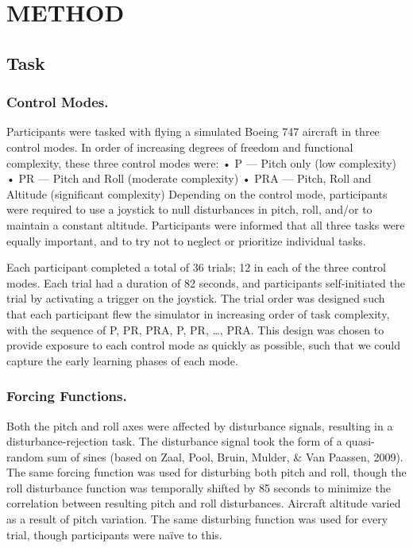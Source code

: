 \section{METHOD}

\subsection{Task}

\subsubsection{Control Modes.} Participants were tasked with flying a simulated Boeing 747 aircraft in three control modes. In order of increasing degrees of freedom and functional complexity, these three control modes were:
•	P — Pitch only (low complexity)
•	PR — Pitch and Roll (moderate complexity)
•	PRA — Pitch, Roll and Altitude (significant complexity)
Depending on the control mode, participants were required to use a joystick to null disturbances in pitch, roll, and/or to maintain a constant altitude.
Participants were informed that all three tasks were equally important, and to try not to neglect or prioritize individual tasks.

Each participant completed a total of 36 trials; 12 in each of the three control modes.
Each trial had a duration of 82 seconds, and participants self-initiated the trial by activating a trigger on the joystick.
The trial order was designed such that each participant flew the simulator in increasing order of task complexity, with the sequence of P, PR, PRA, P, PR, …, PRA.
This design was chosen to provide exposure to each control mode as quickly as possible, such that we could capture the early learning phases of each mode.

\subsubsection{Forcing Functions.}
Both the pitch and roll axes were affected by disturbance signals, resulting in a disturbance-rejection task.
The disturbance signal took the form of a quasi-random sum of sines (based on Zaal, Pool, Bruin, Mulder, \& Van Paassen, 2009).
The same forcing function was used for disturbing both pitch and roll, though the roll disturbance function was temporally shifted by 85 seconds to minimize the correlation between resulting pitch and roll disturbances.
Aircraft altitude varied as a result of pitch variation.
The same disturbing function was used for every trial, though participants were naïve to this.

